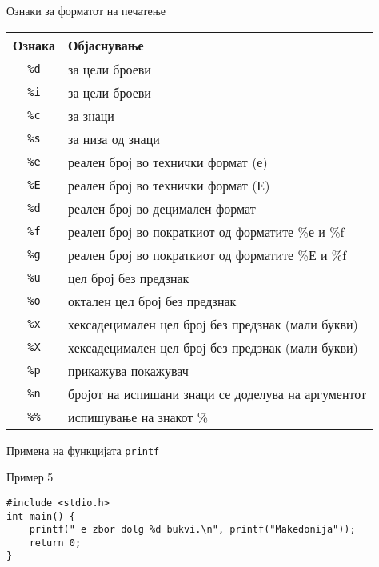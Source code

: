 \begin{frame}{Ознаки за форматот на печатење}
\begin{scriptsize}
\begin{tabular}{|c|l|}
\hline \textbf{Ознака} & \textbf{Објаснување} \\ 
\hline \texttt{\%d} & за цели броеви \\ 
\hline \texttt{\%i} & за цели броеви \\ 
\hline \texttt{\%c} & за знаци \\ 
\hline \texttt{\%s} & за низа од знаци \\ 
\hline \texttt{\%e} & реален број во технички формат (е) \\ 
\hline \texttt{\%E} & реален број во технички формат (Е) \\ 
\hline \texttt{\%d} & реален број во децимален формат \\ 
\hline \texttt{\%f} & реален број во пократкиот од форматите \%е и \%f \\ 
\hline \texttt{\%g} & реален број во пократкиот од форматите \%Е и \%f \\  
\hline \texttt{\%u} & цел број без предзнак \\ 
\hline \texttt{\%o} & октален цел број без предзнак \\ 
\hline \texttt{\%x} & хексадецимален цел број без предзнак (мали букви) \\ 
\hline \texttt{\%X} & хексадецимален цел број без предзнак (мали букви) \\ 
\hline \texttt{\%p} & прикажува покажувач \\ 
\hline \texttt{\%n} & бројот на испишани знаци се доделува на аргументот \\ 
\hline \texttt{\%\%} & испишување на знакот \% \\ 
\hline 
\end{tabular} 
\end{scriptsize}
\end{frame}

\begin{frame}[fragile]{Примена на функцијата \texttt{printf}}
    \begin{exampleblock}{Пример 5}
\begin{lstlisting}
#include <stdio.h>
int main() {
    printf(" e zbor dolg %d bukvi.\n", printf("Makedonija"));
    return 0;
}
\end{lstlisting}
    \end{exampleblock}
\end{frame}

